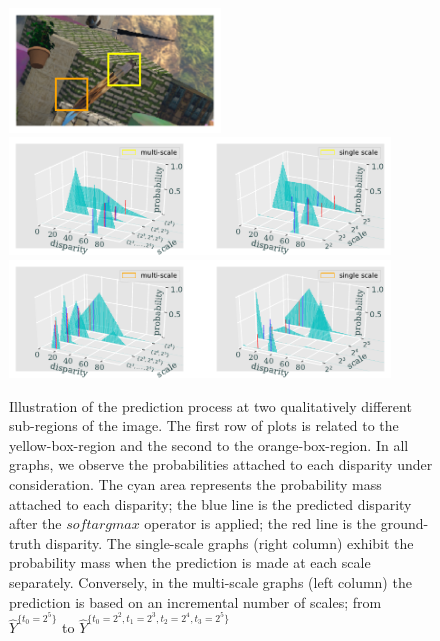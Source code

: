 \documentclass[runningheads]{llncs}
\begin{document}
\begin{figure}[htb!]
    \begin{center}
        \includegraphics[width=0.5\textwidth]{paper/latex/figures/multiscale_importance_image_patches.pdf}\\
        \includegraphics[width=0.9\textwidth]{paper/latex/figures/multiscale_importance_graph_high_resolution.pdf}\\
        \includegraphics[width=0.9\textwidth]{figures/multiscale_importance_graph_low_resolution.pdf}
    \end{center}
    
    \caption{Illustration of the prediction process at two qualitatively different sub-regions of the image. The first row of plots is related to the yellow-box-region and the second to the orange-box-region. In all graphs, we observe the probabilities attached to each disparity under consideration. The cyan area represents the probability mass attached to each disparity; the blue line is the predicted disparity after the $softargmax$ operator is applied; the red line is the ground-truth disparity. The single-scale graphs (right column) exhibit the probability mass when the prediction is made at each scale separately. Conversely, in the multi-scale graphs (left column) the prediction is based on an incremental number of scales; from $\hat{Y}^{\{t_0 = 2^5\}}$ to $\hat{Y}^{\{t_0=2^2, t_1=2^3, t_2=2^4, t_3 = 2^5\}}$}
    \label{fig:multiscale_importance}
\end{figure}
\end{document}
